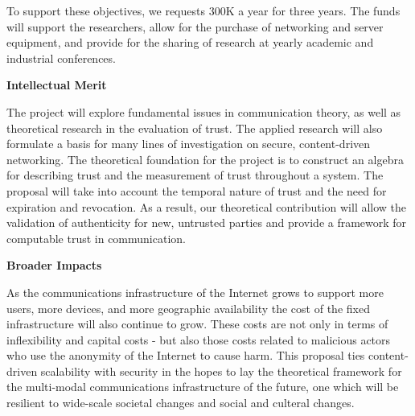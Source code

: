 \documentclass{proposalnsf}
\begin{document}
To support these objectives, we requests 300K a year for three years. The funds will support the researchers, allow for the purchase of networking and server equipment, and provide for the sharing of research at yearly academic and industrial conferences.

\noindent
{\large{\bf Intellectual Merit}}

\noindent
The project will explore fundamental issues in communication theory, as well as theoretical research in the evaluation of trust. The applied research will also formulate a basis for many lines of investigation on secure, content-driven networking. The theoretical foundation for the project is to construct an algebra for describing trust and the measurement of trust throughout a system. The proposal will take into account the temporal nature of trust and the need for expiration and revocation. As a result, our theoretical contribution will allow the validation of authenticity for new, untrusted parties and provide a framework for computable trust in communication.

\noindent
{\large{\bf Broader Impacts}}

\noindent
As the communications infrastructure of the Internet grows to support more users, more devices, and more geographic availability the cost of the fixed infrastructure will also continue to grow. These costs are not only in terms of inflexibility and capital costs - but also those costs related to malicious actors who use the anonymity of the Internet to cause harm. This proposal ties content-driven scalability with security in the hopes to lay the theoretical framework for the multi-modal communications infrastructure of the future, one which will be resilient to wide-scale societal changes and social and culteral changes.
\end{document}
